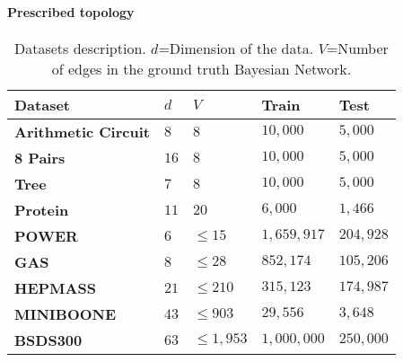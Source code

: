 \paragraph{Prescribed topology}
\begin{table}
    \caption{Datasets description. $d$=Dimension of the data. $V$=Number of edges in the ground truth Bayesian Network.} \label{tab:ds_desc}
    \centering
    \scriptsize
    \setlength{\tabcolsep}{2pt}
    \renewcommand{\arraystretch}{1.5}

    \begin{tabular}{l l l l l}
        \hline\hline
        Dataset & $d$ & $V$ & Train & Test\\ \hline
        \textbf{Arithmetic Circuit} & $8$ & $8$ & $10,000$ & $5,000$\\
        \textbf{8 Pairs}& $16$ & $8$  & $10,000$ & $5,000$\\
        \textbf{Tree}  & $7$ & $8$ & $10,000$ & $5,000$\\
        \textbf{Protein} & $11$ & $20$ & $6,000$ & $1,466$\\
        \hline
        \textbf{POWER} & $6$ & $\leq 15$ & $1,659,917$ & $204,928$\\
        \textbf{GAS} & $8$ & $\leq 28$ & $852,174$ & $105,206$\\
        \textbf{HEPMASS} & $21$ & $\leq 210$ & $315,123$ & $174,987$\\
        \textbf{MINIBOONE} & $43$ & $\leq 903$ & $29,556$ & $3,648$\\
        \textbf{BSDS300} & $63$ & $\leq 1,953$ & $1,000,000$ & $250,000$\\
        \hline \hline
    \end{tabular}
\end{table}
